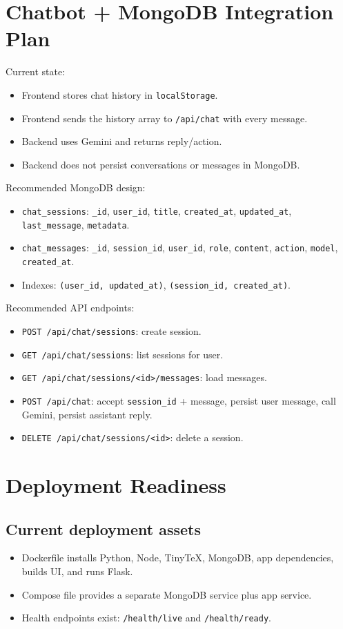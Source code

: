 \documentclass[11pt]{article}
\begin{document}
\section{Chatbot + MongoDB Integration Plan}

Current state:
\begin{itemize}
  \item Frontend stores chat history in \texttt{localStorage}.
  \item Frontend sends the history array to \texttt{/api/chat} with every message.
  \item Backend uses Gemini and returns reply/action.
  \item Backend does not persist conversations or messages in MongoDB.
\end{itemize}

Recommended MongoDB design:
\begin{itemize}
  \item \texttt{chat\_sessions}: \texttt{\_id}, \texttt{user\_id}, \texttt{title}, \texttt{created\_at}, \texttt{updated\_at}, \texttt{last\_message}, \texttt{metadata}.
  \item \texttt{chat\_messages}: \texttt{\_id}, \texttt{session\_id}, \texttt{user\_id}, \texttt{role}, \texttt{content}, \texttt{action}, \texttt{model}, \texttt{created\_at}.
  \item Indexes: \texttt{(user\_id, updated\_at)}, \texttt{(session\_id, created\_at)}.
\end{itemize}

Recommended API endpoints:
\begin{itemize}
  \item \texttt{POST /api/chat/sessions}: create session.
  \item \texttt{GET /api/chat/sessions}: list sessions for user.
  \item \texttt{GET /api/chat/sessions/<id>/messages}: load messages.
  \item \texttt{POST /api/chat}: accept \texttt{session\_id} + message, persist user message, call Gemini, persist assistant reply.
  \item \texttt{DELETE /api/chat/sessions/<id>}: delete a session.
\end{itemize}

\section{Deployment Readiness}

\subsection{Current deployment assets}
\begin{itemize}
  \item Dockerfile installs Python, Node, TinyTeX, MongoDB, app dependencies, builds UI, and runs Flask.
  \item Compose file provides a separate MongoDB service plus app service.
  \item Health endpoints exist: \texttt{/health/live} and \texttt{/health/ready}.
\end{itemize}
\end{document}
